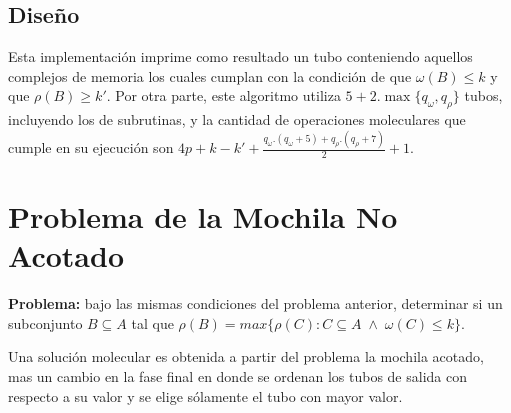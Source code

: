\documentclass[12pt, letterpaper, twoside]{article}
\begin{document}
    \begin{algorithm}
        \begin{algorithmic}[1]
            \EndFor
            \EndFor
            \EndProcedure
        \end{algorithmic}
    \end{algorithm}
    \subsection{Diseño}

    Esta implementación imprime como resultado un tubo conteniendo aquellos complejos de memoria los cuales cumplan con la condición de que $\omega(B)\leq{k}$ y que $\rho(B)\geq{k'}$. Por otra parte, este algoritmo utiliza $5 + 2 . \max{\{q_\omega, q_\rho\}}$ tubos, incluyendo los de subrutinas, y la cantidad de operaciones moleculares que cumple en su ejecución son $4p+k-k'+\frac{q_\omega.(q_\omega+5)+q_\rho.(q_\rho+7)}{2}+1$.

    \newpage
    \section{Problema de la Mochila No Acotado}
    \textbf{Problema:} bajo las mismas condiciones del problema anterior, determinar si un subconjunto $B\subseteq A$ tal que $\rho(B) =max\{\rho(C):C\subseteq A\;\land\;\omega(C) \leq k\}$.


    Una solución molecular es obtenida a partir del problema la mochila acotado, mas un cambio en la fase final en donde se ordenan los tubos de salida con respecto a su valor y se elige sólamente el tubo con mayor valor.
\end{document}
